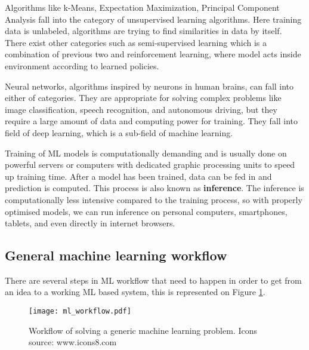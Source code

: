 Algorithms like k-Means, Expectation Maximization, Principal Component Analysis fall into the category of unsupervised learning algorithms.
Here training data is unlabeled, algorithms are trying to find similarities in data by itself\cite{geron}.
There exist other categories such as semi-supervised learning which is a combination of previous two and reinforcement learning, where model acts inside environment according to learned policies\cite{geron}.

Neural networks, algorithms inspired by neurons in human brains\cite{geron}\cite{cs231n}, can fall into either of categories. 
They are appropriate for solving complex problems like image classification, speech recognition, and autonomous driving, but they require a large amount of data and computing power for training.
They fall into field of deep learning, which is a sub-field of machine learning.

Training of ML models is computationally demanding and is usually done on powerful servers or computers with dedicated graphic processing units to speed up training time.
After a model has been trained, data can be fed in and prediction is computed. 
This process is also known as \textbf{inference}.
The inference is computationally less intensive compared to the training process, so with properly optimised models, we can run inference on personal computers, smartphones, tablets, and even directly in internet browsers.


\subsection{ General machine learning workflow}

There are several steps in ML workflow that need to happen in order to get from an idea to a working ML based system, this is represented on Figure \ref{ml_workflow}.

\begin{figure}[ht]
        \centering
        \texttt{[image: ml\_workflow.pdf]} 
        \caption{ Workflow of solving a generic machine learning problem. Icons source: www.icons8.com}
        \label{ml_workflow}
\end{figure}


